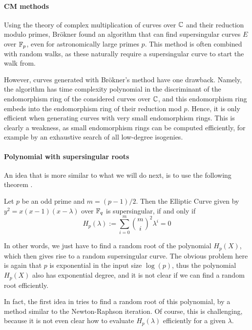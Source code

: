 \paragraph{CM methods} Using the theory of complex multiplication of curves over $\mathbb{C}$ and their reduction modulo primes, Brökner \cite{constructing_supersingular_curves} found an algorithm that can find supersingular curves $E$ over $\mathbb{F}_p$, even for astronomically large primes $p$.
This method is often combined with random walks, as these naturally require a supersingular curve to start the walk from.

However, curves generated with Brökner's method have one drawback.
Namely, the algorithm has time complexity polynomial in the discriminant of the endomorphism ring of the considered curves over $\mathbb{C}$, and this endomorphism ring embeds into the endomorphism ring of their reduction mod $p$.
Hence, it is only efficient when generating curves with very small endomorphism rings.
This is clearly a weakness, as small endomorphism rings can be computed efficiently, for example by an exhaustive search of all low-degree isogenies.

\paragraph{Polynomial with supersingular roots} An idea that is more similar to what we will do next, is to use the following theorem \cite[Thm~V.4.1]{arithmetic_elliptic_curves}.
\begin{theorem}
    Let $p$ be an odd prime and $m = (p - 1)/2$. Then the Elliptic Curve given by $y^2 = x(x - 1)(x - \lambda)$ over $\mathbb{F}_q$ is supersingular, if and only if
    \begin{equation*}
        H_p(\lambda) := \sum_{i = 0}^m {m \choose i}^2 \lambda^i = 0
    \end{equation*}
\end{theorem}
In other words, we just have to find a random root of the polynomial $H_p(X)$, which then gives rise to a random supersingular curve.
The obvious problem here is again that $p$ is exponential in the input size $\log(p)$, thus the polynomial $H_p(X)$ also has exponential degree, and it is not clear if we can find a random root efficiently.

In fact, the first idea in \cite{base_paper} tries to find a random root of this polynomial, by a method similar to the Newton-Raphson iteration.
Of course, this is challenging, because it is not even clear how to evaluate $H_p(\lambda)$ efficiently for a given $\lambda$.

